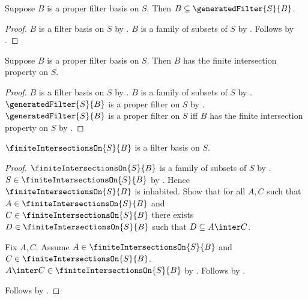 \begin{proposition}\label{proper_filter_basis_in_generated_filter}
    Suppose $B$ is a proper filter basis on $S$.
    Then $B\subseteq\generatedFilter{S}{B}$.
\end{proposition}
\begin{proof}
    $B$ is a filter basis on $S$ by
        .
    $B$ is a family of subsets of $S$ by .
    Follows by .
\end{proof}

\begin{proposition}\label{proper_filter_basis_has_hosted_fip}
    Suppose $B$ is a proper filter basis on $S$.
    Then $B$ has the finite intersection property on $S$.
\end{proposition}
\begin{proof}
    $B$ is a filter basis on $S$ by
        .
    $B$ is a family of subsets of $S$ by .
    $\generatedFilter{S}{B}$ is a proper filter on $S$ by
        .
    $\generatedFilter{S}{B}$ is a proper filter on $S$ iff
        $B$ has the finite intersection property on $S$ by
        .
\end{proof}

\begin{proposition}\label{finite_intersections_on_is_filter_basis}
    $\finiteIntersectionsOn{S}{B}$ is a filter basis on $S$.
\end{proposition}
\begin{proof}
    $\finiteIntersectionsOn{S}{B}$ is a family of subsets of $S$ by
        .
    $S\in\finiteIntersectionsOn{S}{B}$ by
        .
    Hence $\finiteIntersectionsOn{S}{B}$ is inhabited.
    Show that for all $A,C$ such that
        $A\in\finiteIntersectionsOn{S}{B}$ and
        $C\in\finiteIntersectionsOn{S}{B}$ there exists
        $D\in\finiteIntersectionsOn{S}{B}$ such that
        $D\subseteq A\inter C$.
    \begin{subproof}
        Fix $A,C$.
        Assume $A\in\finiteIntersectionsOn{S}{B}$ and
            $C\in\finiteIntersectionsOn{S}{B}$.
        $A\inter C\in\finiteIntersectionsOn{S}{B}$ by
            .
        Follows by .
    \end{subproof}
    Follows by .
\end{proof}

